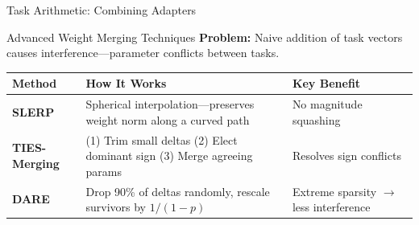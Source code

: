 \documentclass[aspectratio=169]{beamer}
\begin{document}
\begin{frame}{Task Arithmetic: Combining Adapters}
\end{frame}

\begin{frame}{Advanced Weight Merging Techniques}
  \small
  \textbf{Problem:} Naive addition of task vectors causes interference---parameter conflicts between tasks.

  \vspace{6pt}
  \begin{center}
  \footnotesize
  \setlength{\tabcolsep}{5pt}
  \begin{tabular}{p{2.0cm}p{4.5cm}p{4.0cm}}
    \toprule
    \textbf{Method} & \textbf{How It Works} & \textbf{Key Benefit} \\
    \midrule
    \textbf{SLERP} & Spherical interpolation---preserves weight norm along a curved path & No magnitude squashing \\
    \textbf{TIES-Merging} & (1) Trim small deltas (2) Elect dominant sign (3) Merge agreeing params & Resolves sign conflicts \\
    \textbf{DARE} & Drop 90\% of deltas randomly, rescale survivors by $1/(1-p)$ & Extreme sparsity $\rightarrow$ less interference \\
    \bottomrule
  \end{tabular}
  \end{center}


\end{frame}
\end{document}
